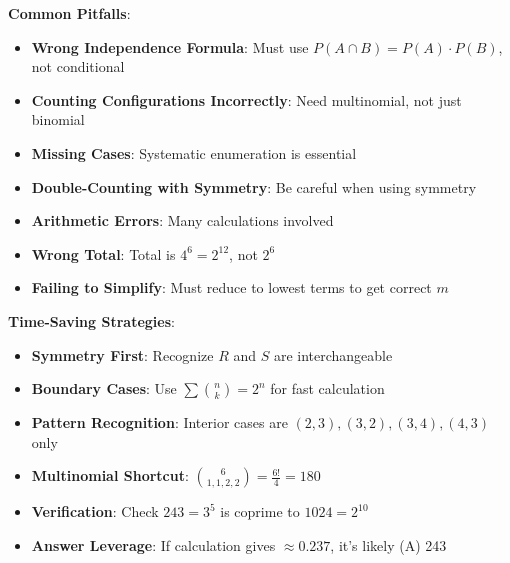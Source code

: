 \documentclass[12pt]{article}
\begin{document}
\begin{warning}
\textbf{Common Pitfalls}:
\begin{itemize}
    \item \textbf{Wrong Independence Formula}: Must use $P(A \cap B) = P(A) \cdot P(B)$, not conditional
    \item \textbf{Counting Configurations Incorrectly}: Need multinomial, not just binomial
    \item \textbf{Missing Cases}: Systematic enumeration is essential
    \item \textbf{Double-Counting with Symmetry}: Be careful when using symmetry
    \item \textbf{Arithmetic Errors}: Many calculations involved
    \item \textbf{Wrong Total}: Total is $4^6 = 2^{12}$, not $2^6$
    \item \textbf{Failing to Simplify}: Must reduce to lowest terms to get correct $m$
\end{itemize}
\end{warning}

\begin{protip}
\textbf{Time-Saving Strategies}:
\begin{itemize}
    \item \textbf{Symmetry First}: Recognize $R$ and $S$ are interchangeable
    \item \textbf{Boundary Cases}: Use $\sum \binom{n}{k} = 2^n$ for fast calculation
    \item \textbf{Pattern Recognition}: Interior cases are $(2,3), (3,2), (3,4), (4,3)$ only
    \item \textbf{Multinomial Shortcut}: $\binom{6}{1,1,2,2} = \frac{6!}{4} = 180$
    \item \textbf{Verification}: Check $243 = 3^5$ is coprime to $1024 = 2^{10}$
    \item \textbf{Answer Leverage}: If calculation gives $\approx 0.237$, it's likely (A) 243
\end{itemize}
\end{protip}
\end{document}
